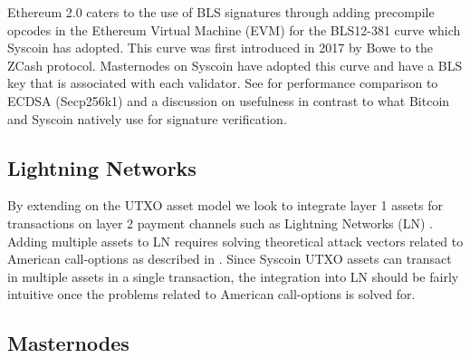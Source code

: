 \documentclass[peerreview]{ieeesyscoin}
\begin{document}
Ethereum 2.0 caters to the use of BLS signatures through adding precompile opcodes in the Ethereum Virtual Machine (EVM) for the BLS12-381 curve \cite{Dra18} which Syscoin has adopted. This curve was first introduced in 2017 by Bowe \cite{Bow17}  to the ZCash protocol. Masternodes on Syscoin have adopted this curve and have a BLS key that is associated with each validator. See \cite{Blo18} for performance comparison to ECDSA (Secp256k1) and a discussion on usefulness in contrast to what Bitcoin and Syscoin natively use for signature verification.


\subsection{Lightning Networks}
By extending on the UTXO asset model we look to integrate layer 1 assets for transactions on layer 2 payment channels such as Lightning Networks (LN) \cite{Poon16}. Adding multiple assets to LN requires solving theoretical attack vectors related to American call-options as described in \cite{LN}. Since Syscoin UTXO assets can transact in multiple assets in a single transaction, the integration into LN should be fairly intuitive once the problems related to American call-options is solved for.


\subsection{Masternodes}
\end{document}
